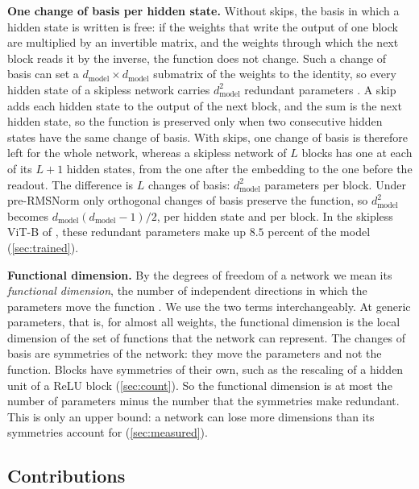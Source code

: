 \documentclass[10pt]{article}
\theoremstyle{definition}
\theoremstyle{remark}
\newcommand{\dm}{d_{\mathrm{model}}}
\newcommand{\para}[1]{\smallskip\noindent\textbf{#1}\hspace{0.5em}}
\begin{document}
\para{One change of basis per hidden state.} Without skips, the basis in which a hidden state is written is free: if the weights that write the output of one block are multiplied by an invertible matrix, and the weights through which the next block reads it by the inverse, the function does not change. Such a change of basis can set a $\dm\times\dm$ submatrix of the weights to the identity, so every hidden state of a skipless network carries $\dm^2$ redundant parameters \citep{karbevski2026dimension}. A skip adds each hidden state to the output of the next block, and the sum is the next hidden state, so the function is preserved only when two consecutive hidden states have the same change of basis. With skips, one change of basis is therefore left for the whole network, whereas a skipless network of $L$ blocks has one at each of its $L+1$ hidden states, from the one after the embedding to the one before the readout. The difference is $L$ changes of basis: $\dm^2$ parameters per block. Under pre-RMSNorm only orthogonal changes of basis preserve the function, so $\dm^2$ becomes $\dm(\dm-1)/2$, per hidden state and per block. In the skipless ViT-B of \citet{ji2026cutting}, these redundant parameters make up $8.5$ percent of the model (\cref{sec:trained}).

\para{Functional dimension.} By the degrees of freedom of a network we mean its \emph{functional dimension}, the number of independent directions in which the parameters move the function \citep{grigsby2022functional}. We use the two terms interchangeably. At generic parameters, that is, for almost all weights, the functional dimension is the local dimension of the set of functions that the network can represent. The changes of basis are symmetries of the network: they move the parameters and not the function. Blocks have symmetries of their own, such as the rescaling of a hidden unit of a ReLU block (\cref{sec:count}). So the functional dimension is at most the number of parameters minus the number that the symmetries make redundant. This is only an upper bound: a network can lose more dimensions than its symmetries account for (\cref{sec:measured}).

\subsection{Contributions}\label{sec:contributions}
\end{document}

